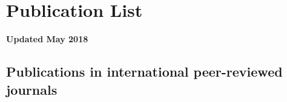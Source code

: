 \renewcommand\evenpagerightmark{{\scshape\small Appendix A}}
\renewcommand\oddpageleftmark{{\scshape\small Publication List}}



\chapter[Publication List]{Publication List}
\label{app1}

\textbf{Updated May 2018}
\npar
\section*{Publications in international peer-reviewed journals}

